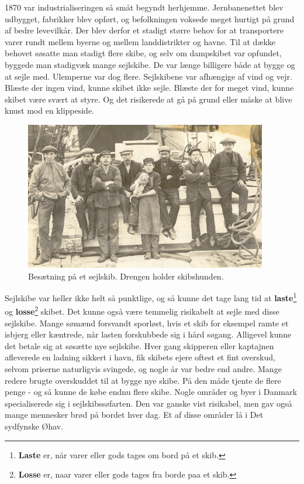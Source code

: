 1870 var industrialiseringen så småt begyndt herhjemme. Jernbanenettet
blev udbygget, fabrikker blev opført, og befolkningen voksede meget
hurtigt på grund af bedre levevilkår. Der blev derfor et stadigt større
behov for at transportere varer rundt mellem byerne og mellem
landdistrikter og havne. Til at dække behovet søsatte man stadigt flere
skibe, og selv om dampskibet var opfundet, byggede man stadigvæk mange
sejlskibe. De var længe billigere både at bygge og at sejle med.
Ulemperne var dog flere. Sejlskibene var afhængige af vind og vejr.
Blæste der ingen vind, kunne skibet ikke sejle. Blæste der for meget
vind, kunne skibet være svært at styre. Og det risikerede at gå på grund
eller måske at blive knust mod en klippeside.

\begin{figure}
\centering
\includegraphics{images/sejlskibe_indledning-skibsh.jpg}
\caption{Besætning på et sejlskib. Drengen holder skibshunden.}
\end{figure}

Sejlskibe var heller ikke helt så punktlige, og så kunne det tage lang
tid at \textbf{laste}\footnote{\textbf{Laste} er, når varer eller gods
  tages om bord på et skib.} og \textbf{losse}\footnote{\textbf{Losse}
  er, naar varer eller gods tages fra borde paa et skib.} skibet. Det
kunne også være temmelig risikabelt at sejle med disse sejlskibe. Mange
sømænd forsvandt sporløst, hvis et skib for eksempel ramte et isbjerg
eller kæntrede, når lasten forskubbede sig i hård søgang. Alligevel
kunne det betale sig at søsætte nye sejlskibe. Hver gang skipperen eller
kaptajnen afleverede en ladning sikkert i havn, fik skibets ejere oftest
et fint overskud, selvom priserne naturligvis svingede, og nogle år var
bedre end andre. Mange redere brugte overskuddet til at bygge nye skibe.
På den måde tjente de flere penge - og så kunne de købe endnu flere
skibe. Nogle områder og byer i Danmark specialiserede sig i
sejlskibssøfarten. Den var ganske vist risikabel, men gav også mange
mennesker brød på bordet hver dag. Et af disse områder lå i Det
sydfynske Øhav.

